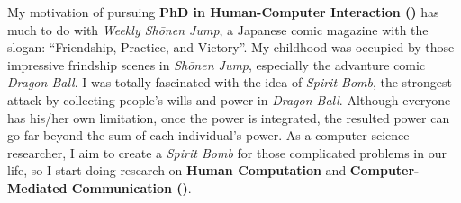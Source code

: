 \noindent My motivation of pursuing \textbf{PhD in Human-Computer Interaction ()}
has much to do with \textit{Weekly Sh\={o}nen Jump}, a Japanese comic magazine with the slogan: ``Friendship, Practice, and Victory''.
My childhood was occupied by those impressive frindship scenes in \textit{Sh\={o}nen Jump}, especially the advanture comic \textit{Dragon Ball}.
I was totally fascinated with the idea of \textit{Spirit Bomb}, 
the strongest attack by collecting people's wills and power in \textit{Dragon Ball}.
Although everyone has his/her own limitation, once the power is integrated, 
the resulted power can go far beyond the sum of each individual's power.
As a computer science researcher, I aim to create a \textit{Spirit Bomb} for those complicated problems in our life,
so I start doing research on \textbf{Human Computation} and \textbf{Computer-Mediated Communication ()}. \\



